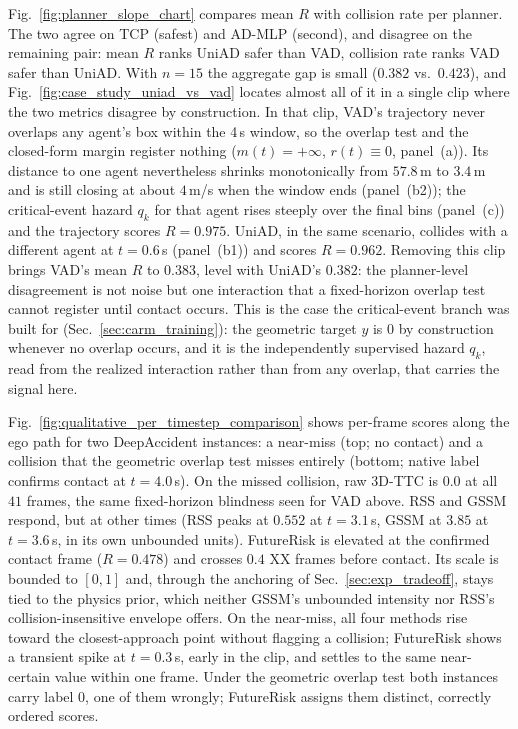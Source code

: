 \documentclass[letterpaper, 10 pt, conference]{ieeeconf}  %
\begin{document}
Fig.~\ref{fig:planner_slope_chart} compares mean $R$ with collision rate
per planner. The two agree on TCP (safest) and AD-MLP (second), and
disagree on the remaining pair: mean $R$ ranks UniAD safer than VAD,
collision rate ranks VAD safer than UniAD. With $n=15$ the aggregate gap
is small ($0.382$ vs.\ $0.423$), and Fig.~\ref{fig:case_study_uniad_vs_vad}
locates almost all of it in a single clip where the two metrics disagree
by construction. In that clip, VAD's trajectory never overlaps any
agent's box within the 4\,s window, so the overlap test and the
closed-form margin register nothing ($m(t)=+\infty$, $r(t)\equiv0$,
panel~(a)). Its distance to one agent nevertheless shrinks monotonically
from $57.8$\,m to $3.4$\,m and is still closing at about $4$\,m/s when the
window ends (panel~(b2)); the critical-event hazard $q_k$ for that agent
rises steeply over the final bins (panel~(c)) and the trajectory scores
$R=0.975$. UniAD, in the same scenario, collides with a different agent
at $t=0.6$\,s (panel~(b1)) and scores $R=0.962$. Removing this clip
brings VAD's mean $R$ to $0.383$, level with UniAD's $0.382$: the
planner-level disagreement is not noise but one interaction that a
fixed-horizon overlap test cannot register until contact occurs. This is
the case the critical-event branch was built for
(Sec.~\ref{sec:carm_training}): the geometric target $y$ is $0$ by
construction whenever no overlap occurs, and it is the independently
supervised hazard $q_k$, read from the realized interaction rather than
from any overlap, that carries the signal here.

Fig.~\ref{fig:qualitative_per_timestep_comparison} shows per-frame scores
along the ego path for two DeepAccident instances: a near-miss (top; no
contact) and a collision that the geometric overlap test misses entirely
(bottom; native label confirms contact at $t=4.0$\,s). On the missed
collision, raw 3D-TTC is $0.0$ at all $41$ frames, the same fixed-horizon
blindness seen for VAD above. RSS and GSSM respond, but at other times
(RSS peaks at $0.552$ at $t=3.1$\,s, GSSM at $3.85$ at $t=3.6$\,s, in its
own unbounded units). FutureRisk is elevated at the confirmed contact
frame ($R=0.478$) and crosses $0.4$
XX frames %
before contact. Its scale is bounded to $[0,1]$ and, through the
anchoring of Sec.~\ref{sec:exp_tradeoff}, stays tied to the physics
prior, which neither GSSM's unbounded intensity nor RSS's
collision-insensitive envelope offers. On the near-miss, all four methods
rise toward the closest-approach point without flagging a collision;
FutureRisk shows a transient spike at $t=0.3$\,s, early in the clip, and
settles to the same near-certain value within one frame. Under the
geometric overlap test both instances carry label $0$, one of them
wrongly; FutureRisk assigns them distinct, correctly ordered scores.
\end{document}
